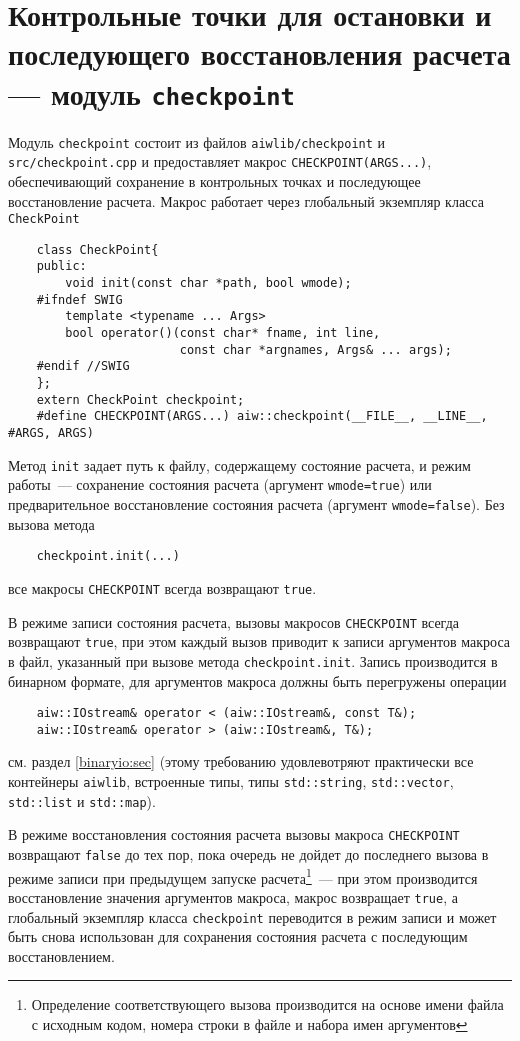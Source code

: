 \section{Контрольные точки для остановки и последующего восстановления расчета --- модуль {\tt checkpoint}}
Модуль \verb'checkpoint' состоит из файлов \verb'aiwlib/checkpoint' и \verb'src/checkpoint.cpp' и
предоставляет макрос \verb'CHECKPOINT(ARGS...)', обеспечивающий сохранение в контрольных точках и последующее восстановление расчета.
Макрос работает через глобальный экземпляр класса \verb'CheckPoint'
\begin{verbatim}
    class CheckPoint{
    public:
        void init(const char *path, bool wmode);
    #ifndef SWIG
        template <typename ... Args> 
        bool operator()(const char* fname, int line,
                        const char *argnames, Args& ... args);
    #endif //SWIG
    };
    extern CheckPoint checkpoint;
    #define CHECKPOINT(ARGS...) aiw::checkpoint(__FILE__, __LINE__, #ARGS, ARGS)
\end{verbatim}
Метод \verb'init' задает путь к файлу, содержащему состояние расчета, и режим работы~--- сохранение состояния расчета (аргумент \verb'wmode=true')
или предварительное восстановление состояния расчета (аргумент \verb'wmode=false').
Без вызова метода
\begin{verbatim}
    checkpoint.init(...)
\end{verbatim}
все макросы \verb'CHECKPOINT' всегда возвращают \verb'true'.

В режиме записи состояния расчета, вызовы макросов \verb'CHECKPOINT' всегда возвращают \verb'true',
при этом каждый вызов приводит к записи аргументов макроса в файл, указанный при вызове метода \verb'checkpoint.init'.
Запись производится в бинарном формате, для аргументов макроса должны быть перегружены операции
\begin{verbatim}
    aiw::IOstream& operator < (aiw::IOstream&, const T&);
    aiw::IOstream& operator > (aiw::IOstream&, T&);
\end{verbatim}
см. раздел \ref{binaryio:sec} (этому требованию удовлевотряют практически все контейнеры \verb'aiwlib', встроенные типы, типы \verb'std::string',
\verb'std::vector', \verb'std::list' и \verb'std::map').

В режиме восстановления состояния расчета вызовы макроса \verb'CHECKPOINT' возвращают \verb'false' до тех пор, пока очередь не дойдет до последнего вызова
в режиме записи при предыдущем запуске расчета\footnote{Определение соответствующего вызова производится на основе  имени файла с исходным кодом,
  номера строки в файле и набора имен аргументов}~--- при этом производится восстановление значения аргументов макроса, макрос возвращает \verb'true',
а глобальный экземпляр класса \verb'checkpoint' переводится в режим записи и может быть снова использован для сохранения состояния расчета с последующим восстановлением.

